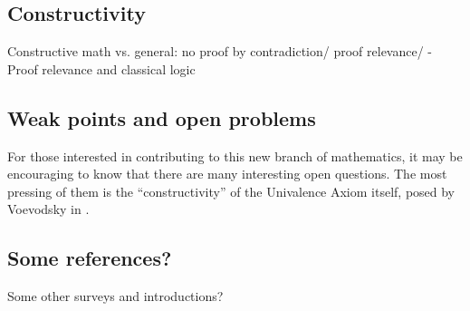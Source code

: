 {%


\subsection*{Constructivity} 

Constructive math vs. general: no proof by contradiction/ proof relevance/
- Proof relevance and classical logic

\subsection*{Weak points and open problems} 

For those interested in contributing to this new branch of mathematics, it may be encouraging to know that there are many interesting open questions.  The most pressing of them is the ``constructivity'' of the Univalence Axiom itself, posed by Voevodsky in \cite{Vo2012}.  


\subsection*{Some references?}

Some other surveys and introductions?

}%

